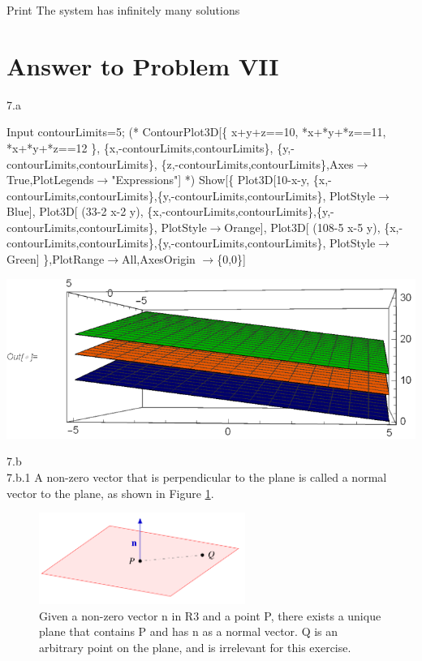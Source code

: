 \documentclass[11pt,a4paper]{article}
\begin{document}
\begin{mmaCell}{Print}
The system has infinitely many solutions
\end{mmaCell}

\clearpage
\section{Answer to Problem VII}\label{sec:P07}

7.a\\
\begin{mmaCell}[addtoindex=3,moredefined={contourLimits},morefunctionlocal={x, y}]{Input}
contourLimits=5;
(*
ContourPlot3D[\{
  x+y+z==10,
  *x+*y+*z==11,
  *x+*y+*z==12
\},
\{x,-contourLimits,contourLimits\},
\{y,-contourLimits,contourLimits\},
\{z,-contourLimits,contourLimits\},Axes\(\pmb{\to}\)True,PlotLegends\(\pmb{\to}\)"Expressions"]
*)
Show[\{
  Plot3D[10-x-y,
    \{x,-contourLimits,contourLimits\},\{y,-contourLimits,contourLimits\},
    PlotStyle\(\pmb{\to}\)Blue],
  Plot3D[ (33-2 x-2 y),
    \{x,-contourLimits,contourLimits\},\{y,-contourLimits,contourLimits\},
    PlotStyle\(\pmb{\to}\)Orange],
  Plot3D[ (108-5 x-5 y),
    \{x,-contourLimits,contourLimits\},\{y,-contourLimits,contourLimits\},
    PlotStyle\(\pmb{\to}\)Green]
\},PlotRange\(\pmb{\to}\)All,AxesOrigin \(\pmb{\to}\)\{0,0\}]
\end{mmaCell}

\includegraphics{MathematicaP1_gr2.eps}

7.b\\
7.b.1  A non-zero vector that is perpendicular to the plane is called a normal vector to the plane, as shown in Figure \ref{img:01}. \parencite{Kuttler}

\begin{figure}[!htbp]
\centering
\includegraphics[width=0.60\textwidth]{normalv.png}
\caption{Given a non-zero vector n in R3 and a point P, there exists a unique plane that contains P and has n as a normal vector. \parencite{Kuttler} Q is an arbitrary point on the plane, and is irrelevant for this exercise. \label{img:01}}
\end{figure}
\end{document}
